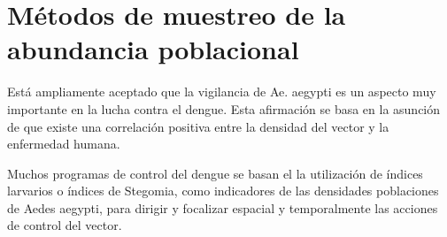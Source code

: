 \section{Métodos de muestreo de la abundancia poblacional}
\label{sec:densidad-vectorial-introduccion}

Está ampliamente aceptado que la vigilancia de Ae. aegypti es un aspecto
muy importante en la lucha contra el dengue. Esta afirmación se basa en
la asunción de que existe una correlación positiva entre la densidad del
vector y la enfermedad humana\cite{dengueUruguayCap2}.

Muchos programas de control del dengue se basan el la utilización de
índices larvarios o índices de Stegomia, como indicadores de las densidades
poblaciones de Aedes aegypti, para dirigir y focalizar espacial y temporalmente
las acciones de control del vector.
